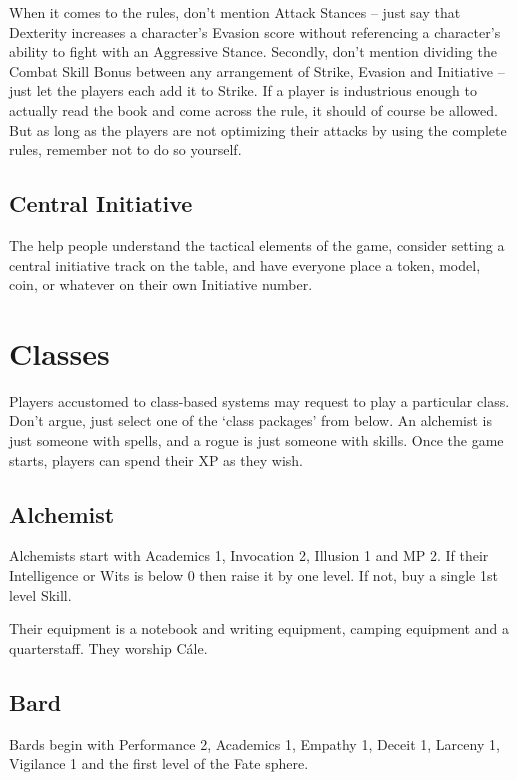 When it comes to the rules, don't mention Attack Stances -- just say that Dexterity increases a character's Evasion score without referencing a character's ability to fight with an Aggressive Stance.  Secondly, don't mention dividing the Combat Skill Bonus between any arrangement of Strike, Evasion and Initiative -- just let the players each add it to Strike. If a player is industrious enough to actually read the book and come across the rule, it should of course be allowed. But as long as the players are not optimizing their attacks by using the complete rules, remember not to do so yourself.

\subsection{Central Initiative}

The help people understand the tactical elements of the game, consider setting a central initiative track on the table, and have everyone place a token, model, coin, or whatever on their own Initiative number.

\section{Classes}

Players accustomed to class-based systems may request to play a particular class. Don't argue, just select one of the `class packages' from below.  An alchemist is just someone with spells, and a rogue is just someone with skills.  Once the game starts, players can spend their XP as they wish.

\subsection{Alchemist}

Alchemists start with Academics 1, Invocation 2, Illusion 1 and MP 2.  If their Intelligence or Wits is below 0 then raise it by one level.  If not, buy a single 1st level Skill.

Their equipment is a notebook and writing equipment, camping equipment and a quarterstaff. They worship C\'{a}le.

\subsection{Bard}

Bards begin with Performance 2, Academics 1, Empathy 1, Deceit 1, Larceny 1, Vigilance 1 and the first level of the Fate sphere.

